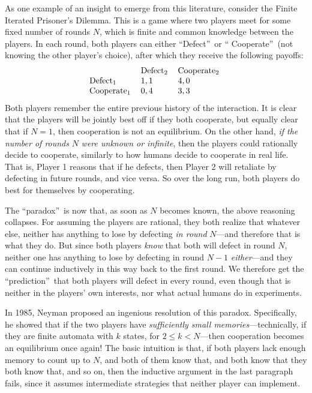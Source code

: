 \documentclass[12pt,onecolumn]{article}%
\begin{document}
As one example of an insight to emerge from this literature, consider the
Finite Iterated Prisoner's Dilemma. This is a game where two players meet
for some fixed number of rounds $N$, which is finite and common knowledge
between the players. In each round, both players can either
\textquotedblleft Defect\textquotedblright\  or \textquotedblleft
Cooperate\textquotedblright\  (not knowing the other player's choice), after
which they receive the following payoffs:%
\[%
\begin{tabular}
[c]{lll}
& Defect$_{2}$ & Cooperate$_{2}$\\
Defect$_{1}$ & $1,1$ & $4,0$\\
Cooperate$_{1}$ & $0,4$ & $3,3$%
\end{tabular}
 \
\]
Both players remember the entire previous history of the interaction. It is
clear that the players will be jointly best off if they both cooperate, but
equally clear that if $N=1$, then cooperation is not an equilibrium. On the
other hand, \textit{if the number of rounds }$N$\textit{ were unknown or
infinite}, then the players could rationally decide to cooperate, similarly to
how humans decide to cooperate in real life. That is, Player 1 reasons that
if he defects, then Player 2 will retaliate by defecting in future rounds, and
vice versa. So over the long run, both players do best for themselves by cooperating.

The \textquotedblleft paradox\textquotedblright\  is now that, as soon as $N$
becomes known, the above reasoning collapses. For assuming the players are
rational, they both realize that whatever else, neither has anything to lose
by defecting \textit{in round} $N$---and therefore that is what they do. But
since both players \textit{know} that both will defect in round $N$, neither
one has anything to lose by defecting in round $N-1$ \textit{either}---and
they can continue inductively in this way back to the first round. We
therefore get the \textquotedblleft prediction\textquotedblright\  that both
players will defect in every round, even though that is neither in the
players' own interests, nor what actual humans do in experiments.

In 1985, Neyman \cite{neyman} proposed an ingenious resolution of this
paradox. Specifically, he showed that if the two players have
\textit{sufficiently small memories}---technically, if they are finite
automata with $k$ states, for $2\leq k<N$---then cooperation becomes an
equilibrium once again! The basic intuition is that, if both players lack
enough memory to count up to $N$, and both of them know that, and both know
that they both know that, and so on, then the inductive argument in the last
paragraph fails, since it assumes intermediate strategies that neither player
can implement.
\end{document}
